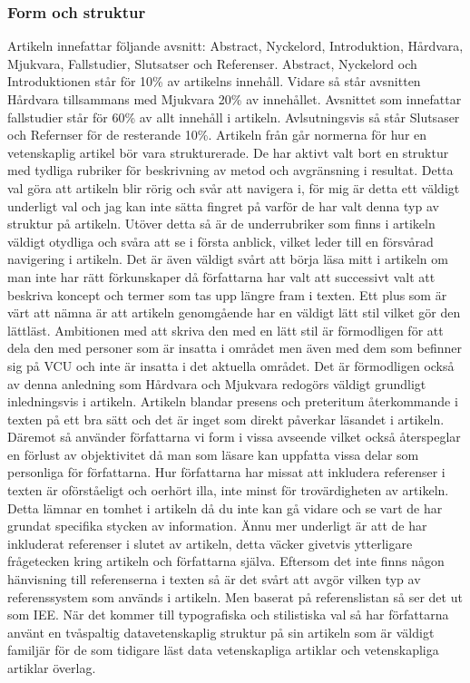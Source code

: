 \documentclass[a4paper]{article}
\begin{document}
\subsubsection{Form och struktur}
Artikeln innefattar följande avsnitt: Abstract, Nyckelord, Introduktion, Hårdvara, Mjukvara, Fallstudier, Slutsatser och Referenser. Abstract, Nyckelord och Introduktionen står för 10\% av artikelns innehåll. Vidare så står avsnitten Hårdvara tillsammans med Mjukvara 20\% av innehållet. Avsnittet som innefattar fallstudier står för 60\% av allt innehåll i artikeln. Avlsutningsvis så står Slutsaser och Refernser för de resterande 10\%. Artikeln från går normerna för hur en vetenskaplig artikel bör vara strukturerade. De har aktivt valt bort en struktur med tydliga rubriker för beskrivning av metod och avgränsning i resultat. Detta val göra att artikeln blir rörig och svår att navigera i, för mig är detta ett väldigt underligt val och jag kan inte sätta fingret på varför de har valt denna typ av struktur på artikeln. Utöver detta så är de underrubriker som finns i artikeln väldigt otydliga och svåra att se i första anblick, vilket leder till en försvårad navigering i artikeln. Det är även väldigt svårt att börja läsa mitt i artikeln om man inte har rätt förkunskaper då författarna har valt att successivt valt att beskriva koncept och termer som tas upp längre fram i texten.
Ett plus som är värt att nämna är att artikeln genomgående har en väldigt lätt stil vilket gör den lättläst. Ambitionen med att skriva den med en lätt stil är förmodligen för att dela den med personer som är insatta i området men även med dem som befinner sig på VCU och inte är insatta i det aktuella området. Det är förmodligen också av denna anledning som Hårdvara och Mjukvara redogörs väldigt grundligt inledningsvis i artikeln. 
Artikeln blandar presens och preteritum återkommande i texten på ett bra sätt och det är inget som direkt påverkar läsandet i artikeln. Däremot så använder författarna vi form i vissa avseende vilket också återspeglar en förlust av objektivitet då man som läsare kan uppfatta vissa delar som personliga för författarna. 
Hur författarna har missat att inkludera referenser i texten är oförståeligt och oerhört illa, inte minst för trovärdigheten av artikeln. Detta lämnar en tomhet i artikeln då du inte kan gå vidare och se vart de har grundat specifika stycken av information. Ännu mer underligt är att de har inkluderat referenser i slutet av artikeln, detta väcker givetvis ytterligare frågetecken kring artikeln och författarna själva. Eftersom det inte finns någon hänvisning till referenserna i texten så är det svårt att avgör vilken typ av referenssystem som används i artikeln. Men baserat på referenslistan så ser det ut som IEE. När det kommer till typografiska och stilistiska val så har författarna använt en tvåspaltig datavetenskaplig struktur på sin artikeln som är väldigt familjär för de som tidigare läst data vetenskapliga artiklar och vetenskapliga artiklar överlag.
\end{document}

